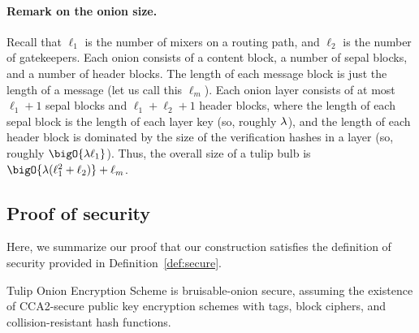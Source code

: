 \documentclass[runningheads,a4paper]{llncs}
\begin{document}
\paragraph{Remark on the onion size.}
Recall that $\ell_1$ is the number of mixers on a routing path, and $\ell_2$ is the number of gatekeepers. 
Each onion consists of a content block, a number of sepal blocks, and a number of header blocks. The length of each message block is just the length of a message (let us call this $\ell_m$). Each onion layer consists of at most $\ell_1+1$ sepal blocks and $\ell_1 + \ell_2 + 1$ header blocks, where the length of each sepal block is the length of each layer key (so, roughly $\lambda$), and the length of each header block is dominated by the size of the verification hashes in a layer (so, roughly $\bigO{\secpar \ell_1}$). Thus, the overall size of a tulip bulb is $\bigO{\secpar(\ell_1^2+\ell_2)} + \ell_m$. 




\subsection{Proof of security} \label{sec:securityproof}
\newcommand{\hybrid}[1]{\mathsf{Hybrid}_{#1}} 

Here, we summarize our proof that our construction satisfies the definition of security provided in Definition~\ref{def:secure}.

\begin{theorem} \label{thm:security} 
Tulip Onion Encryption Scheme is bruisable-onion secure, assuming the  existence of CCA2-secure public key encryption schemes with tags, 
block ciphers, and 
collision-resistant hash functions.
\end{theorem}
\end{document}
